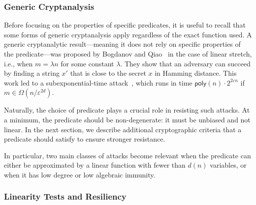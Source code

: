 \documentclass[journal=tosc,submission]{iacrtrans}
\theoremstyle{theorem}
\newcommand\cb[1]{\textcolor{red!80}{\textbf{Christina:} #1}}
\newcommand\yr[1]{\textcolor{brown!80}{\textbf{Yann:} #1}}
\begin{document}
\subsubsection{Generic Cryptanalysis}

Before focusing on the properties of specific predicates, it is useful to recall that some forms of generic cryptanalysis apply regardless of the exact function used. 
A generic cryptanalytic result—meaning it does not rely on specific properties of the predicate—was proposed by Bogdanov and Qiao~\cite{DBLP:conf/approx/BogdanovQ09} in the case of linear stretch, i.e., when $m = \lambda n$ for some constant $\lambda$. They show that an adversary can succeed by finding a string $x'$ that is close to the secret $x$ in Hamming distance. This work led to a subexponential-time attack~\cite{EPRINT:Applebaum15}, which runs in time $\mathsf{poly}(n) \cdot 2^{2\varepsilon n}$ if $m \in \Omega(n / \varepsilon^{2d})$.

Naturally, the choice of predicate plays a crucial role in resisting such attacks. At a minimum, the predicate should be non-degenerate: it must be unbiased and not linear. In the next section, we describe additional cryptographic criteria that a predicate should satisfy to ensure stronger resistance.

In particular, two main classes of attacks become relevant when the predicate can either be approximated by a linear function with fewer than $d(n)$ variables, or when it has low degree or low algebraic immunity.




\subsubsection{Linearity Tests and Resiliency}

\end{document}
